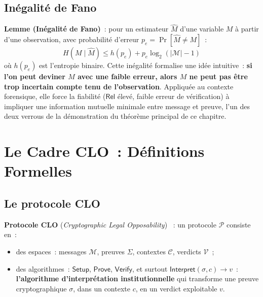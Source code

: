 \subsection{Inégalité de Fano}

\begin{boxjuris}
\textbf{Lemme (Inégalité de Fano)}~: pour un estimateur $\hat M$
d'une variable $M$ à partir d'une observation, avec probabilité
d'erreur $p_e = \Pr[\hat M \neq M]$~:
\begin{equation}
H(M \mid \hat M) \leq h(p_e) + p_e \log_2(|\mathcal{M}|-1)
\label{eq:fano}
\end{equation}
où $h(p_e)$ est l'entropie binaire. Cette inégalité formalise une
idée intuitive~: \textbf{si l'on peut deviner $M$ avec une faible
erreur, alors $M$ ne peut pas être trop incertain compte tenu de
l'observation}. Appliquée au contexte forensique, elle force la
fiabilité ($\mathsf{Rel}$ élevé, faible erreur de vérification) à
impliquer une information mutuelle minimale entre message et
preuve, l'un des deux verrous de la démonstration du théorème
principal de ce chapitre.
\end{boxjuris}

\section{Le Cadre CLO~: Définitions Formelles}
\label{sec:cadre-clo}

\subsection{Le protocole CLO}

\begin{boxdef}
\textbf{Protocole CLO} (\textit{Cryptographic Legal Opposability})
\cite{minka2026clo}~: un protocole $\mathcal{P}$ consiste en~:
\begin{itemize}
    \item des espaces~: messages $\mathcal{M}$, preuves $\Sigma$,
          contextes $\mathcal{C}$, verdicts $\mathcal{V}$~;
    \item des algorithmes~: $\mathsf{Setup}$, $\mathsf{Prove}$,
          $\mathsf{Verify}$, et surtout
          $\mathsf{Interpret}(\sigma, c) \to v$~: \textbf{l'algorithme
          d'interprétation institutionnelle} qui transforme une
          preuve cryptographique $\sigma$, dans un contexte $c$,
          en un verdict exploitable $v$.
\end{itemize}
\end{boxdef}

